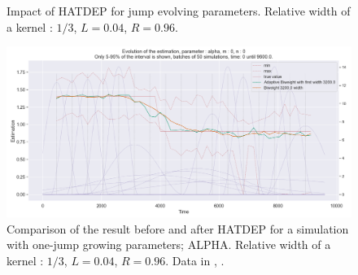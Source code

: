 \begin{figure}
\centering
{} 
\caption{Impact of HATDEP for jump evolving parameters. Relative width of a kernel : $1/3$, $L = 0.04$, $R = 0.96$.}
\label{fig:compar_kernels_2}
\end{figure}

\begin{figure}
\centering
\includegraphics[width = 0.90 \textwidth]{../imag/chap3/2/1.png}
\caption{Comparison of the result before and after HATDEP for a simulation with one-jump growing parameters; ALPHA. Relative width of a kernel : $1/3$, $L = 0.04$, $R = 0.96$. Data in \protect {}, \protect {}.}
\label{fig:first_estimate_2_alpha}
\end{figure}

